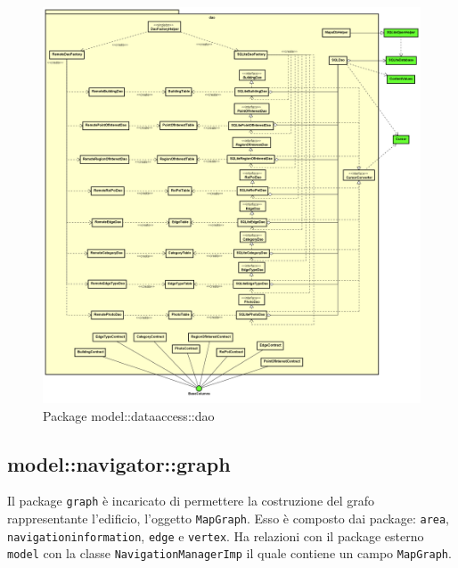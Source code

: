 \documentclass[../DefinizioneDiProdotto.tex,lanscape]{subfiles}
\begin{document}
\begin{figure}[h]
	\includegraphics[width=\textwidth]{img/RelationPackage/dao}
	\caption{Package model::dataaccess::dao}
	\label{daoPackage}
\end{figure}


\newpage

	\subsection{model::navigator::graph}
		Il package \verb|graph| è incaricato di permettere la costruzione del grafo rappresentante l'edificio, l'oggetto \verb|MapGraph|. Esso è composto dai package: \verb|area|, \verb|navigationinformation|, \verb|edge| e \verb|vertex|.  Ha relazioni con il package esterno \verb|model| con la classe \verb|NavigationManagerImp| il quale contiene un campo \verb|MapGraph|.
\end{document}
